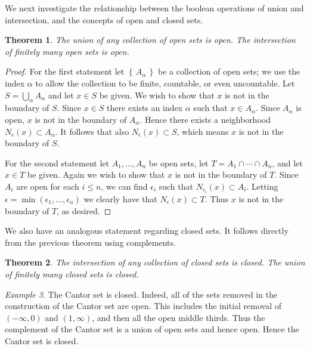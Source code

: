 \documentclass[11pt,oneside]{amsbook}
\newcommand{\set}[1]{\left\{\,#1\,\right\}}
\DeclareMathOperator{\inte}{int}
\theoremstyle{definition}
\theoremstyle{plain}
\newtheorem{theorem}{Theorem}[section]
\theoremstyle{definition}
\theoremstyle{remark}
\newtheorem{example}[theorem]{Example}
\numberwithin{equation}{section}
\numberwithin{figure}{section}
\begin{document}

We next investigate the relationship between the boolean operations of union and intersection, and the concepts of open and closed sets.

\begin{theorem}
  The union of any collection of open sets is open. The intersection of finitely many open sets is open.
\end{theorem}

\begin{proof}
  For the first statement let $\set{A_\alpha}$ be a collection of open sets; we use the index $\alpha$ to allow the collection to be finite, countable, or even uncountable. Let $S=\bigcup_\alpha A_\alpha$ and let $x\in S$ be given. We wish to show that $x$ is not in the boundary of $S$. Since $x\in S$ there exists an index $\alpha$ such that $x\in A_\alpha$. Since $A_\alpha$ is open, $x$ is not in the boundary of $A_\alpha$. Hence there exists a neighborhood $N_\epsilon(x)\subset A_\alpha$. It follows that also $N_\epsilon(x)\subset S$, which means $x$ is not in the boundary of $S$.

  For the second statement let $A_1,\ldots,A_n$ be open sets, let $T=A_1\cap\cdots\cap A_n$, and let $x\in T$ be given. Again we wish to show that $x$ is not in the boundary of $T$. Since $A_i$ are open for each $i\leq n$, we can find $\epsilon_i$ such that $N_{\epsilon_i}(x)\subset A_i$. Letting $\epsilon=\min(\epsilon_1,\ldots,\epsilon_n)$ we clearly have that $N_\epsilon(x)\subset T$. Thus $x$ is not in the boundary of $T$, as desired.
\end{proof}

We also have an analogous statement regarding closed sets. It follows directly from the previous theorem using complements.

\begin{theorem}
  The intersection of any collection of closed sets is closed. The union of finitely many closed sets is closed.
\end{theorem}

\begin{example}
  The Cantor set is closed. Indeed, all of the sets removed in the construction of the Cantor set are open. This includes the initial removal of $(-\infty,0)$ and $(1,\infty)$, and then all the open middle thirds. Thus the complement of the Cantor set is a union of open sets and hence open. Hence the Cantor set is closed.
\end{example}
\end{document}
